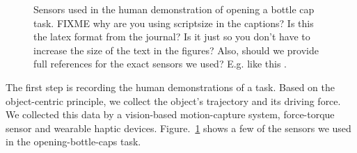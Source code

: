 \begin{figure}
  \centering
    \caption{\scriptsize{Sensors used in the human demonstration of
        opening a bottle cap task.} FIXME why are you using scriptsize
      in the captions?  Is this the latex format from the journal?  Is
      it just so you don't have to increase the size of the text in
      the figures?  Also, should we provide full references for the
      exact sensors we used?  E.g. like this
      \citep{NetLogo2.1,unreal}.}
  \label{fig:devices}
\end{figure}

The first step is recording the human demonstrations of a task. Based on
the object-centric principle, we collect the object's trajectory and its
driving force. %
We collected this data by a vision-based motion-capture system,
force-torque sensor and wearable haptic
devices. Figure.~\ref{fig:devices} shows a few of the sensors we used
in the opening-bottle-caps task. %


